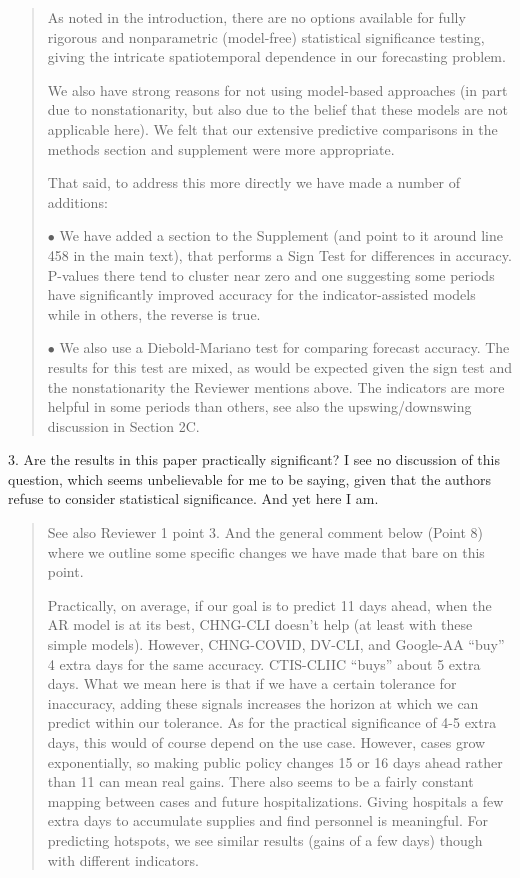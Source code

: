 \documentclass[11pt]{article}
\newenvironment{resp}{\begin{quote}\color{cobalt}}{\end{quote}}
\begin{document}
\begin{resp}
  As noted in the introduction, there are no options available for fully 
  rigorous and nonparametric (model-free) statistical significance testing,
  giving the intricate spatiotemporal dependence in our forecasting problem.  

  We also have strong reasons for not using model-based approaches (in part due
  to nonstationarity, but also due to the belief that these models are not
  applicable here). We felt that our extensive predictive comparisons in the
  methods section and supplement were more appropriate. 

  That said, to address this more directly we have made a number of additions: 

  $\bullet$ We have added a section to the Supplement (and point
  to it around 
  line 458 in the main text), that performs a Sign Test for differences in
  accuracy. P-values there tend to cluster near zero and one suggesting some
  periods have significantly improved accuracy for the indicator-assisted models
  while in others, the reverse is true.

  $\bullet$ We also use a Diebold-Mariano test
  for comparing forecast accuracy. The results for this test are mixed, as would
  be expected given the sign test and
  the nonstationarity the Reviewer mentions above. The indicators are
  more helpful in some periods than others, see also the upswing/downswing
  discussion in Section 2C. 
\end{resp}

3. Are the results in this paper practically significant? I see no discussion of
this question, which seems unbelievable for me to be saying, given that the
authors refuse to consider statistical significance. And yet here I am.

\begin{resp}
  See also Reviewer 1 point 3. And the general comment below (Point 8) where we
  outline some specific changes we have made that bare on this point.
  
  Practically, on average, if our goal is to predict 11 days ahead, when the AR
  model is at its best, CHNG-CLI
  doesn’t help (at least with these simple models). However, CHNG-COVID,
  DV-CLI, and Google-AA ``buy'' 4 extra days for the 
  same accuracy. CTIS-CLIIC ``buys'' about 5 extra days. What we mean here is
  that if we have a certain tolerance for inaccuracy, adding these signals increases the
  horizon at which we can predict within our tolerance. As for the
  practical significance of 4-5 extra days, this would of course depend on the use case.  However, cases grow
  exponentially, so making public policy changes 15 or 16 days ahead rather than
  11 can mean real gains. There also seems to be a fairly constant mapping
  between cases and future hospitalizations. Giving
  hospitals a few extra days to accumulate supplies and find personnel is
  meaningful. For predicting hotspots, we see similar results (gains of a few
  days) though with different indicators. 
\end{resp}
\end{document}
